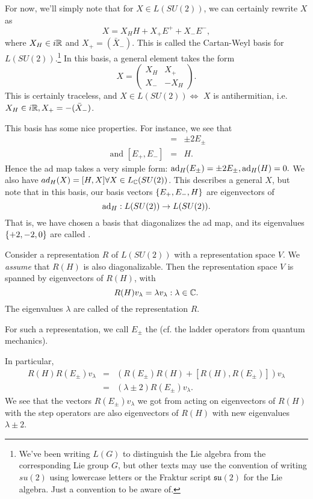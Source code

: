 For now, we'll simply note that for $X\in L(SU(2))$, we can certainly rewrite $X$ as
$$X=X_H H + X_+ E^++ X_- E^-,$$
where $X_H\in i\mathbb{R}$ and $X_+=(\bar X_-).$ This is called the Cartan-Weyl basis for $L(SU(2))$.\footnote{We've been writing $L(G)$ to distinguish the Lie algebra from the corresponding Lie group $G$, but other texts may use the convention of writing $su(2)$ using lowercase letters or the Fraktur script $\mathfrak{su}(2)$ for the Lie algebra. Just a convention to be aware of.}
In this basis, a general element takes the form
$$X=\begin{pmatrix}
X_H & X_+\\
X_-&-X_H
\end{pmatrix}.$$
This is certainly traceless, and $X\in L(SU(2))\iff$ $X$ is antihermitian, i.e. $X_H\in i\mathbb{R}, X_+ = -(\bar X_-)$.

This basis has some nice properties. For instance, we see that
\begin{eqnarray*}
[H,E_\pm] &=& \pm 2 E_\pm\\
\text{ and } [E_+,E_-] &=& H.
\end{eqnarray*}
Hence the ad map takes a very simple form:
$\operatorname{ad}_H(E_\pm)=\pm 2 E_\pm, \operatorname{ad}_H(H)=0.$
We also have $ad_H(X)=[H,X]\forall X \in L_{\mathbb{C}}(SU(2))$. This describes a general $X$, but note that in this basis, our basis vectors $\{E_+,E_-,H\}$ are eigenvectors of
$$\operatorname{ad}_H:L(SU(2))\to L(SU(2)).$$
That is, we have chosen a basis that diagonalizes the ad map, and its eigenvalues $\{+2,-2,0\}$ are called .

\begin{defn}
Consider a representation $R$ of $L(SU(2))$ with a representation space $V$. We \emph{assume} that $R(H)$ is also diagonalizable. Then the representation space $V$ is spanned by eigenvectors of $R(H)$, with
$$R(H)v_\lambda = \lambda v_\lambda: \lambda \in \mathbb{C}.$$
The eigenvalues $\lambda$ are called  of the representation $R$.
\end{defn}
\begin{defn}
For such a representation, we call $E_\pm$ the  (cf. the ladder operators from quantum mechanics).
\end{defn}
In particular,
\begin{eqnarray*}
R(H)R(E_\pm)v_\lambda &=& (R(E_\pm)R(H) + [R(H),R(E_\pm)]) v_\lambda\\
&=&(\lambda \pm 2) R(E_\pm)v_\lambda.
\end{eqnarray*}
We see that the vectors $R(E_\pm)v_\lambda$ we got from acting on eigenvectors of $R(H)$ with the step operators are also eigenvectors of $R(H)$ with new eigenvalues $\lambda \pm 2$.

